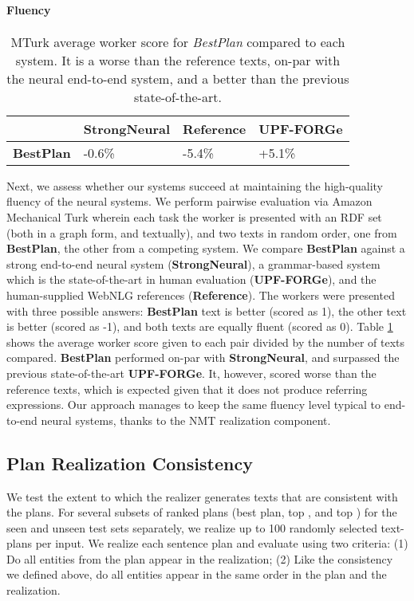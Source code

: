 \documentclass[11pt,a4paper]{article}
\newcommand\ourplans[0]{BestPlan}
\newcommand\ourbaseline[0]{StrongNeural}
\begin{document}
\paragraph{Fluency} 
\begin{table}[t]
\resizebox{\linewidth}{!}
{
\begin{tabular}{|l|l|l|l|}
\hline
            & \textbf{\ourbaseline} & \textbf{Reference} & \textbf{UPF-FORGe} \\ \hline
\textbf{\ourplans}   & -0.6\%      & -5.4\% &  +5.1\%   \\ \hline
\end{tabular}
}
\caption{MTurk average worker score for \emph{\ourplans} compared to each system. 
It is a worse than the reference texts, on-par with the neural end-to-end system, and a better than the previous state-of-the-art.}
\label{table:mturk}
\end{table} Next, we assess whether our systems succeed at maintaining the high-quality fluency of the neural systems.
We perform pairwise evaluation via Amazon Mechanical Turk wherein each task the worker is presented with an RDF set (both in a graph form, and textually), and two texts in random order, one from \textbf{\ourplans}, the other from a competing system. 
We compare \textbf{\ourplans} against a strong end-to-end neural system (\textbf{\ourbaseline}), a grammar-based system which is the state-of-the-art in human evaluation (\textbf{UPF-FORGe}), and the human-supplied WebNLG references (\textbf{Reference}).
The workers were presented with three possible answers: \textbf{\ourplans} text is better (scored as 1), the other text is better (scored as -1), and both texts are equally fluent (scored as 0).
Table \ref{table:mturk} shows the average worker score given to each pair divided by the number of texts compared. 
\textbf{\ourplans} performed on-par with \textbf{\ourbaseline}, and surpassed the previous state-of-the-art \textbf{UPF-FORGe}. It, however, scored worse than the reference texts, which is expected given that it does not produce referring expressions.
Our approach manages to keep the same fluency level typical to end-to-end neural systems, thanks to the NMT realization component.


\subsection{Plan Realization Consistency}
We test the extent to which the realizer generates texts that are consistent with the plans. For several subsets of ranked plans (best plan, top , and top ) for the seen and unseen test sets separately, 
we realize up to 100 randomly selected text-plans per input.
We realize each sentence plan and evaluate using two criteria: (1) Do all entities from the plan appear in the realization; (2) Like the consistency we defined above, do all entities appear in the same order in the plan and the realization.
\end{document}
